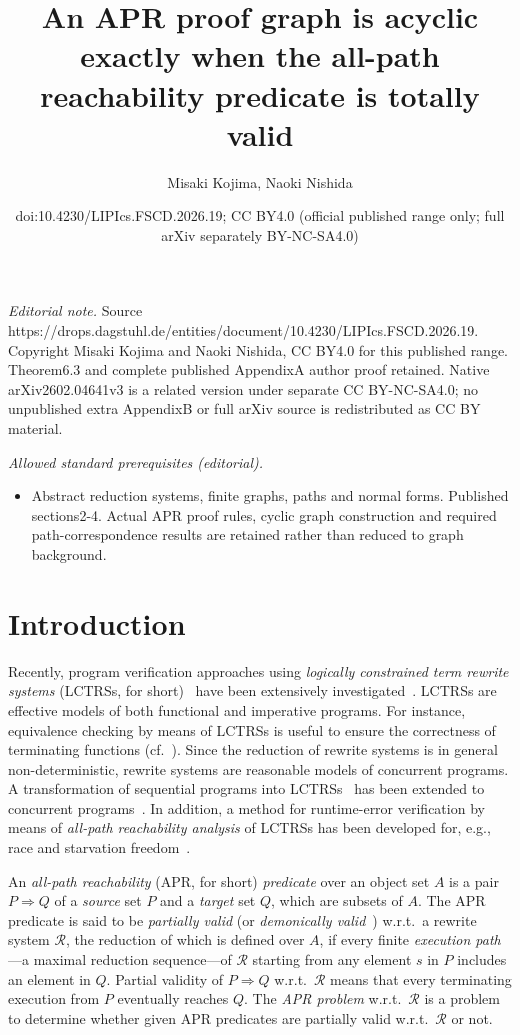 \documentclass[10pt,a4paper]{article}
\title{An APR proof graph is acyclic exactly when the all-path reachability predicate is totally valid}
\author{Misaki Kojima, Naoki Nishida}
\date{doi:10.4230/LIPIcs.FSCD.2026.19; CC BY4.0 (official published range only; full arXiv separately BY-NC-SA4.0)}
\def\cR{\mathcal{R}}
\newcommand{\ReachPred}[2]{#1 \Rightarrow #2}
\begin{document}
\maketitle
\noindent\textit{Editorial note.} Source https://drops.dagstuhl.de/entities/document/10.4230/LIPIcs.FSCD.2026.19. Copyright Misaki Kojima and Naoki Nishida, CC BY4.0 for this published range. Theorem6.3 and complete published AppendixA author proof retained. Native arXiv2602.04641v3 is a related version under separate CC BY-NC-SA4.0; no unpublished extra AppendixB or full arXiv source is redistributed as CC BY material.\par\medskip
\noindent\textit{Allowed standard prerequisites (editorial).}\begin{itemize}
\item Abstract reduction systems, finite graphs, paths and normal forms. Published sections2-4. Actual APR proof rules, cyclic graph construction and required path-correspondence results are retained rather than reduced to graph background.
\end{itemize}\medskip
\section{Introduction}
\label{sec:intro}

Recently, program verification approaches using \emph{logically constrained term rewrite systems} (LCTRSs, for short)~\cite{KN13frocos} have been extensively investigated~\cite{FKN17tocl,WM18,CL18,NW18vstte,KN18eptcs,KNS19ss,CLB23,MNKS23wst,KNM25jlamp,MFK25}.
LCTRSs are effective models of both functional and imperative programs. For instance, equivalence checking by means of LCTRSs is useful to ensure the correctness of terminating functions (cf.~\cite{FKN17tocl}).
Since the reduction of rewrite systems is in general non-deterministic, rewrite systems are reasonable models of concurrent programs.
A transformation of sequential programs into LCTRSs~\cite{FKN17tocl,KN18eptcs} has been extended to concurrent programs~\cite{KNM25jlamp}.
In addition, a method for runtime-error verification by means of \emph{all-path reachability analysis} of LCTRSs has been developed for, e.g., race and starvation freedom~\cite{KN23jlamp,KN23padl,KN24rp}.

An \emph{all-path reachability} (APR, for short) \emph{predicate} over an object set $A$ is a pair $\ReachPred{P}{Q}$ of a \emph{source} set $P$ and a \emph{target} set $Q$, which are subsets of $A$.
The APR predicate is said to be \emph{partially valid} (or \emph{demonically valid}~\cite[Definition~5]{CL18}) w.r.t.\ a rewrite system $\cR$, the reduction of which is defined over $A$, if every finite \emph{execution path}---a maximal reduction sequence---of $\cR$ starting from any element $s$ in $P$ includes an element in $Q$.
Partial validity of $\ReachPred{P}{Q}$ w.r.t.\ $\cR$ means that
every terminating execution from $P$ eventually reaches $Q$.
The \emph{APR problem} w.r.t.\ $\cR$ is a problem to determine whether given APR predicates are partially valid w.r.t.\ $\cR$ or not.
\end{document}
